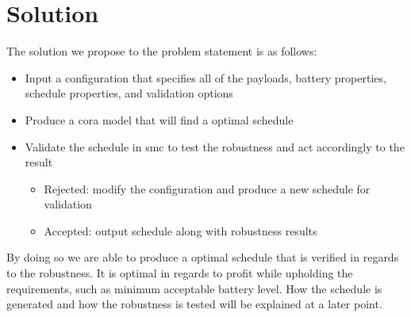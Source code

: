 \section{Solution} \label{sec:solution}
The solution we propose to the problem statement is as follows:
\begin{itemize}
	\item	Input a configuration that specifies all of the payloads, battery properties, schedule properties, and validation options
	\item	Produce a \gls{cora} model that will find a optimal schedule
	\item	Validate the schedule in \gls{smc} to test the robustness and act accordingly to the result
	\begin{itemize}
		\item	Rejected: modify the configuration and produce a new schedule for validation
		\item	Accepted: output schedule along with robustness results
	\end{itemize}
\end{itemize}

By doing so we are able to produce a optimal schedule that is verified in regards to the robustness.
It is optimal in regards to profit while upholding the requirements, such as minimum acceptable battery level.
How the schedule is generated and how the robustness is tested will be explained at a later point.
